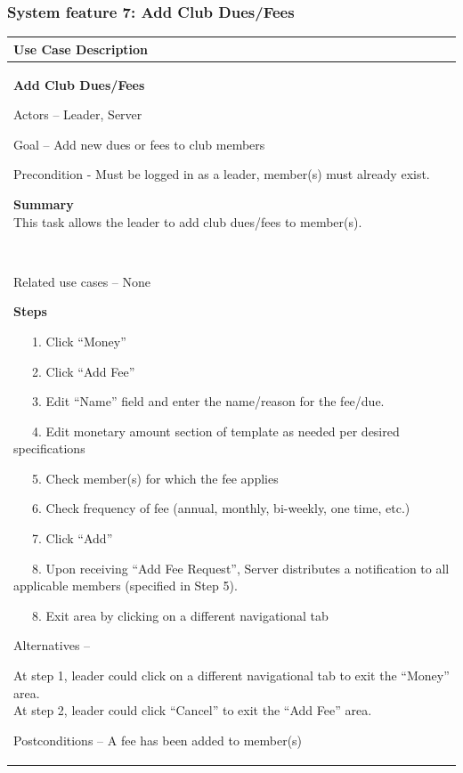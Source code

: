 \documentclass[letterpaper]{article}
\newcommand\textstyleDefaultParagraphFont[1]{#1}
\begin{document}
\bigskip

\subsubsection[System feature 7: Add Club Dues/Fees]{\rmfamily System
feature 7: Add Club Dues/Fees}
\begin{flushleft}
\tablehead{}
\begin{supertabular}{|m{6.42126in}|}
\hline
\bfseries\color{black} Use Case Description\\\hline
{\bfseries\color{black} Add Club Dues/Fees}

{\color{black} Actors -- Leader, Server}

{\color{black} Goal -- Add new dues or fees to club members}

{\color{black} Precondition - Must be logged in as a leader, member(s)
must already exist.}

{\color{black} \textstyleDefaultParagraphFont{\textbf{Summary}}\newline
\textstyleDefaultParagraphFont{This task allows the leader to
}\textstyleDefaultParagraphFont{add club dues/fees to member(s).}}

~

{\color{black} Related use cases -- None}

{\bfseries\color{black} Steps}

{\color{black} \ \ \ 1. Click
{\textquotedblleft}Money{\textquotedblright} }

{\color{black} \ \ \ 2. Click {\textquotedblleft}Add
Fee{\textquotedblright} }

{\color{black} \ \ \ 3. Edit {\textquotedblleft}Name{\textquotedblright}
field and enter the name/reason for the fee/due.}

{\color{black} \ \ \ 4. Edit monetary amount section of template as
needed per desired specifications}

{\color{black} \ \ \ 5. Check member(s) for which the fee applies}

{\color{black} \ \ \ 6. Check frequency of fee (annual, monthly,
bi-weekly, one time, etc.)}

{\color{black} \ \ \ 7. Click
{\textquotedblleft}Add{\textquotedblright}}

{\color{black} \ \ \ 8. Upon receiving {\textquotedblleft}Add Fee
Request{\textquotedblright}, Server distributes a notification to all
applicable members (specified in Step 5). }

{\color{black} \ \ \ 8. Exit area by clicking on a different
navigational tab}

{\color{black} Alternatives -- }

{\color{black} At step 1, leader could click on a different navigational
tab to exit the {\textquotedblleft}Money{\textquotedblright}
area.\newline
At step 2, leader could click
{\textquotedblleft}Cancel{\textquotedblright} to exit the
{\textquotedblleft}Add Fee{\textquotedblright} area.}

\color{black} Postconditions -- A fee has been added to
member(s)\\\hline
\end{supertabular}
\end{flushleft}
\end{document}
